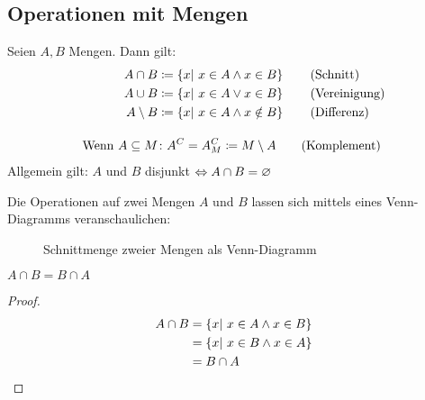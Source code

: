 \subsection{Operationen mit Mengen}

\begin{definition}[Mengenoperationen]
    Seien $A, B$ Mengen. Dann gilt:
    \begin{align*}
        A\cap B &\coloneqq \left\{x|~x\in A \land x\in B\right\}\tag{Schnitt}\\
        A\cup B &\coloneqq \left\{x|~x\in A \lor x\in B\right\}\tag{Vereinigung}\\
        A\setminus B &\coloneqq \left\{x|~x\in A \land x\notin B\right\}\tag{Differenz}\\[10pt]
        \text{Wenn } A\subseteq M&\colon A^{C} = A^{C}_{M} \coloneqq M\setminus A\tag{Komplement}
    \end{align*}
    Allgemein gilt: $A$ und $B$ disjunkt $\Leftrightarrow{} A\cap B = \varnothing$
\end{definition}

\begin{visualisierung}
    Die Operationen auf zwei Mengen $A$ und $B$ lassen sich mittels eines Venn-Diagramms veranschaulichen:
    \begin{figure}[H]
        \centering
        \caption{Schnittmenge zweier Mengen als Venn-Diagramm}
    \end{figure}
\end{visualisierung}


\begin{lemma}
    \marginnote{[31. Okt]}
    $A\cap B = B \cap A$
    \begin{proof}
        \begin{align*}
            A\cap B &= \left\{x|~x\in A \land x \in B\right\}\\
            &= \left\{x|~x\in B \land x \in A\right\}\\
            &= B\cap A\qedhere
        \end{align*}
    \end{proof}
\end{lemma}

